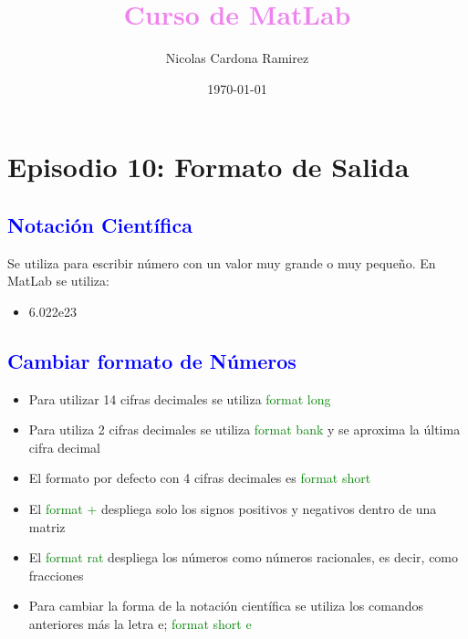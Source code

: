 \documentclass{article}
\date{\today}
\author{Nicolas Cardona Ramirez}
\begin{document}
	
	\title{\textcolor{violet}{Curso de MatLab}}
	\maketitle
	
	\section{Episodio 10: Formato de Salida}
	
	\subsection{\textcolor{blue}{Notación Científica}}
	
	Se utiliza para escribir número con un valor muy grande o muy pequeño. En MatLab se utiliza:
	
	\begin{itemize}
		\item  6.022e23
	\end{itemize}

	\subsection{\textcolor{blue}{Cambiar formato de Números}}
	
	\begin{itemize}
	
	\item Para utilizar 14 cifras decimales se utiliza \textcolor{green}{format long}
	
	\item Para utiliza 2 cifras decimales se utiliza
	\textcolor{green}{format bank} y se aproxima la última cifra decimal
	
	\item El formato por defecto con 4 cifras decimales es \textcolor{green}{format short}
	\item El \textcolor{green}{format +} despliega solo los signos positivos y negativos dentro de una matriz
	
	\item El \textcolor{green}{format rat} despliega los números como números racionales, es decir, como fracciones
	
	\item Para cambiar la forma de la notación científica se utiliza los comandos anteriores más la letra e; \textcolor{green}{format short e}
	
	\end{itemize}
	
\end{document}
